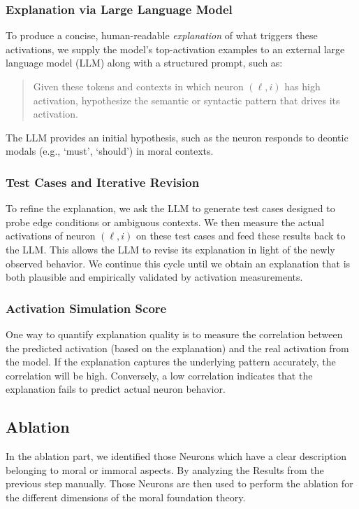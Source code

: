 \documentclass[runninghheads]{llncs}
\begin{document}
\subsubsection{Explanation via Large Language Model}
To produce a concise, human-readable \textit{explanation} of what triggers these activations, we supply the model’s top-activation examples to an external large language model (LLM) along with a structured prompt, such as:

\begin{quote}
    Given these tokens and contexts in which neuron \((\ell,i)\) has high activation, hypothesize the semantic or syntactic pattern that drives its activation.
\end{quote}

The LLM provides an initial hypothesis, such as the neuron responds to deontic modals (e.g., ‘must’, ‘should’) in moral contexts.  

\subsubsection{Test Cases and Iterative Revision}
To refine the explanation, we ask the LLM to generate test cases designed to probe edge conditions or ambiguous contexts. We then measure the actual activations of neuron \((\ell,i)\) on these test cases and feed these results back to the LLM. This allows the LLM to revise its explanation in light of the newly observed behavior. We continue this cycle until we obtain an explanation that is both plausible and empirically validated by activation measurements.

\subsubsection{Activation Simulation Score} 
One way to quantify explanation quality is to measure the correlation between the predicted activation (based on the explanation) and the real activation from the model. If the explanation captures the underlying pattern accurately, the correlation will be high. Conversely, a low correlation indicates that the explanation fails to predict actual neuron behavior.

\subsection{Ablation}

In the ablation part, we identified those Neurons which have a clear description belonging to moral or immoral aspects. By analyzing the Results from the previous step manually. Those Neurons are then used to perform the ablation for the different dimensions of the moral foundation theory. 
\end{document}
